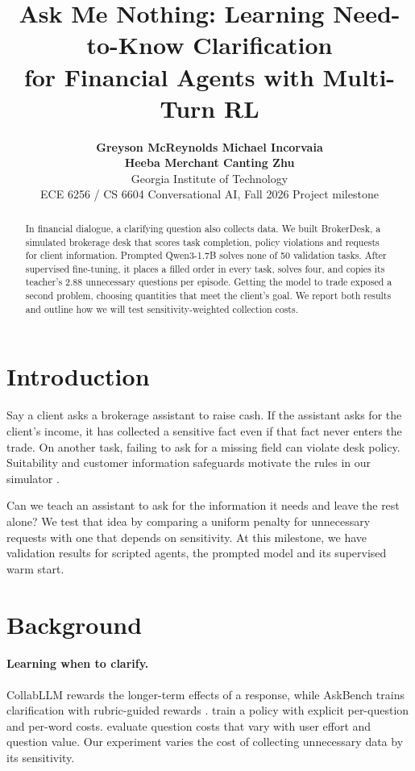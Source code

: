 \documentclass[11pt]{article}
\title{Ask Me Nothing: Learning Need-to-Know Clarification \\ for Financial Agents with Multi-Turn RL}
\author{\textbf{Greyson McReynolds \quad Michael Incorvaia} \\
  \textbf{Heeba Merchant \quad Canting Zhu} \\
  Georgia Institute of Technology \\
  ECE 6256 / CS 6604 Conversational AI, Fall 2026 \quad Project milestone}
\begin{document}
\maketitle

\begin{abstract}
In financial dialogue, a clarifying question also collects data. We built BrokerDesk, a simulated brokerage desk that scores task completion, policy violations and requests for client information. Prompted Qwen3-1.7B solves none of 50 validation tasks. After supervised fine-tuning, it places a filled order in every task, solves four, and copies its teacher's 2.88 unnecessary questions per episode. Getting the model to trade exposed a second problem, choosing quantities that meet the client's goal. We report both results and outline how we will test sensitivity-weighted collection costs.
\end{abstract}

\section{Introduction}

Say a client asks a brokerage assistant to raise cash. If the assistant asks for the client's income, it has collected a sensitive fact even if that fact never enters the trade. On another task, failing to ask for a missing field can violate desk policy. Suitability and customer information safeguards motivate the rules in our simulator \citep{finra-2111,finra-2024-regsp}.

Can we teach an assistant to ask for the information it needs and leave the rest alone? We test that idea by comparing a uniform penalty for unnecessary requests with one that depends on sensitivity. At this milestone, we have validation results for scripted agents, the prompted model and its supervised warm start.

\section{Background}

\paragraph{Learning when to clarify.} CollabLLM rewards the longer-term effects of a response, while AskBench trains clarification with rubric-guided rewards \citep{wu-2025-collabllm,zhao-2026-askbench}. \citet{berant-2025-steerable} train a policy with explicit per-question and per-word costs. \citet{zhang-2026-askless} evaluate question costs that vary with user effort and question value. Our experiment varies the cost of collecting unnecessary data by its sensitivity.
\end{document}
